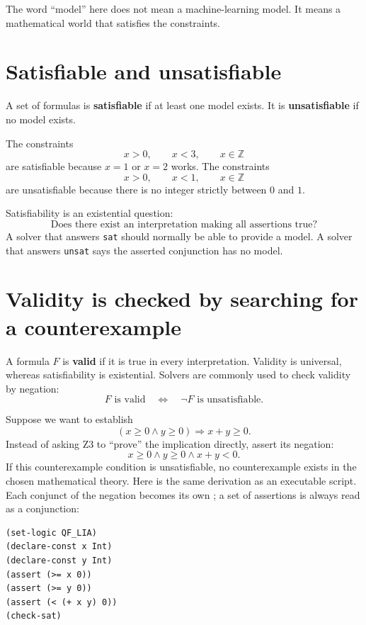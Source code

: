 \documentclass[10pt,letterpaper,oneside]{report}
\newcommand{\code}[1]{\texttt{\detokenize{#1}}}
\newcommand{\Int}{\mathbb{Z}}
\newcommand{\sat}{\texttt{sat}}
\newcommand{\unsat}{\texttt{unsat}}
\newcommand{\term}[1]{\textbf{#1}}
\begin{document}
The word ``model'' here does not mean a machine-learning model. It means a mathematical world that satisfies the constraints.

\section{Satisfiable and unsatisfiable}

A set of formulas is \term{satisfiable} if at least one model exists. It is \term{unsatisfiable} if no model exists.

The constraints
\[
  x>0,\qquad x<3,\qquad x\in\Int
\]
are satisfiable because $x=1$ or $x=2$ works. The constraints
\[
  x>0,\qquad x<1,\qquad x\in\Int
\]
are unsatisfiable because there is no integer strictly between $0$ and $1$.

Satisfiability is an existential question:
\[
  \text{Does there exist an interpretation making all assertions true?}
\]
A solver that answers \sat{} should normally be able to provide a model. A solver that answers \unsat{} says the asserted conjunction has no model.

\section{Validity is checked by searching for a counterexample}
\label{sec:validity-negation}

A formula $F$ is \term{valid} if it is true in every interpretation. Validity is universal, whereas satisfiability is existential. Solvers are commonly used to check validity by negation:
\[
  F\text{ is valid}\quad\Longleftrightarrow\quad \neg F\text{ is unsatisfiable}.
\]

Suppose we want to establish
\[
  (x\ge 0 \land y\ge 0)\Longrightarrow x+y\ge 0.
\]
Instead of asking Z3 to ``prove'' the implication directly, assert its negation:
\[
  x\ge 0 \land y\ge 0 \land x+y<0.
\]
If this counterexample condition is unsatisfiable, no counterexample exists in the chosen mathematical theory.
Here is the same derivation as an executable script. Each conjunct of the negation becomes its own \code{assert}; a set of assertions is always read as a conjunction:

\begin{lstlisting}[language=SMTLib,caption={Checking validity by asserting the negation.}]
(set-logic QF_LIA)
(declare-const x Int)
(declare-const y Int)
(assert (>= x 0))
(assert (>= y 0))
(assert (< (+ x y) 0))
(check-sat)
\end{lstlisting}
\end{document}
